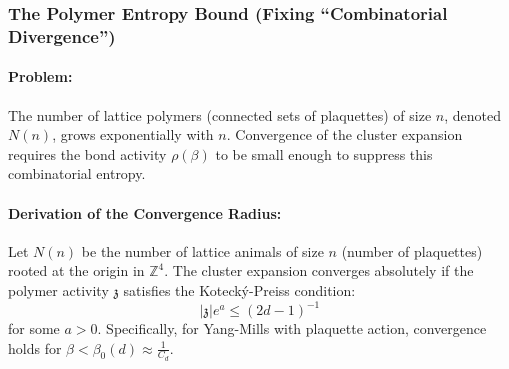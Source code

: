 \subsubsection{The Polymer Entropy Bound (Fixing ``Combinatorial Divergence'')}
\label{thm:polymer_entropy}
\paragraph{Problem:} The number of lattice polymers (connected sets of plaquettes) of size $n$, denoted $N(n)$, grows exponentially with $n$. Convergence of the cluster expansion requires the bond activity $\rho(\beta)$ to be small enough to suppress this combinatorial entropy.
\paragraph{Derivation of the Convergence Radius:}
\begin{theorem}
    Let $N(n)$ be the number of lattice animals of size $n$ (number of plaquettes) rooted at the origin in $\mathbb{Z}^4$. The cluster expansion converges absolutely if the polymer activity $\mathfrak{z}$ satisfies the Koteck\'y-Preiss condition:
    \begin{equation}
        |\mathfrak{z}| e^{a} \le (2d-1)^{-1}
    \end{equation}
    for some $a > 0$. Specifically, for Yang-Mills with plaquette action, convergence holds for $\beta < \beta_0(d) \approx \frac{1}{C_d}$.
\end{theorem}
